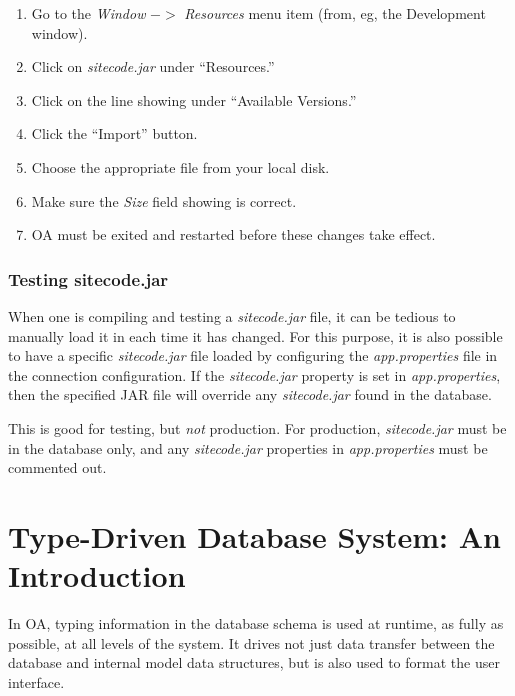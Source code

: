 \documentclass[11pt]{article}
\begin{document}
\begin{enumerate}
\item Go to the \emph{Window} $->$ \emph{Resources} menu item (from, eg, the Development window).
 \item Click on \emph{sitecode.jar} under ``Resources.''

\item Click on the line showing under ``Available Versions.''

\item Click the ``Import'' button.

\item Choose the appropriate file from your local disk.

\item Make sure the \emph{Size} field showing is correct.

\item OA must be exited and restarted before these changes take effect.

\end{enumerate}

\subsubsection{Testing sitecode.jar}

When one is compiling and testing a \emph{sitecode.jar} file, it can be tedious to manually load it in each time it has changed.  For this purpose, it is also possible to have a specific \emph{sitecode.jar} file loaded by configuring the \emph{app.properties} file in the connection configuration.  If the \emph{sitecode.jar} property is set in \emph{app.properties}, then the specified JAR file will override any \emph{sitecode.jar} found in the database.

This is good for testing, but \emph{not} production.  For production, \emph{sitecode.jar} must be in the database only, and any \emph{sitecode.jar} properties in \emph{app.properties} must be commented out.

\section{Type-Driven Database System: An Introduction}

In OA, typing information in the database schema is used at runtime, as fully as
possible, at all levels of the system.  It drives not just data transfer
between the database and internal model data structures, but is also used to format the user interface.
\end{document}
